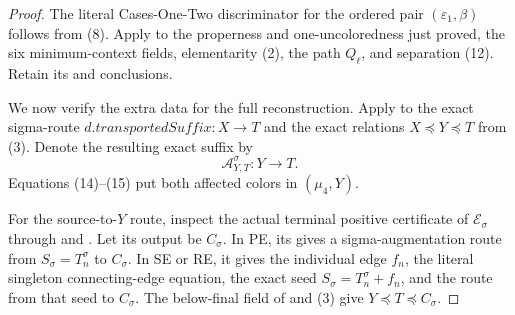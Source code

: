 \begin{proof}
The literal Cases-One-Two discriminator for the ordered pair
$(\varepsilon _1,\beta)$ follows from (8).  Apply
 to the properness and
one-uncoloredness just proved, the six minimum-context fields,
elementarity (2), the path $Q_\ell$, and separation (12).  Retain its
 and  conclusions.

We now verify the extra data for the full reconstruction.  Apply
 to the exact sigma-route
$d.\mathit{transportedSuffix}:X\longrightarrow T$ and the exact
relations $X\preccurlyeq Y\preccurlyeq T$ from (3).  Denote the
resulting exact suffix by
\[
                  \mathcal A^\sigma_{Y,T}:Y\longrightarrow T. \tag{16}
\]
Equations (14)--(15) put both affected colors in
$(\mu _4,Y)$.

For the source-to-$Y$ route, inspect the actual terminal positive
certificate of $\mathcal E_\sigma$ through
 and .  Let its
output be $C_\sigma$.  In PE, its  gives a
sigma-augmentation route from $S_\sigma=T_n^\sigma$ to $C_\sigma$.
In SE or RE, it gives the individual edge $f_n$, the literal singleton
connecting-edge equation, the exact
 seed
$S_\sigma=T_n^\sigma+f_n$, and the route from that seed to $C_\sigma$.
The below-final field of  and (3) give
$Y\preccurlyeq T\preccurlyeq C_\sigma$.


\end{proof}
